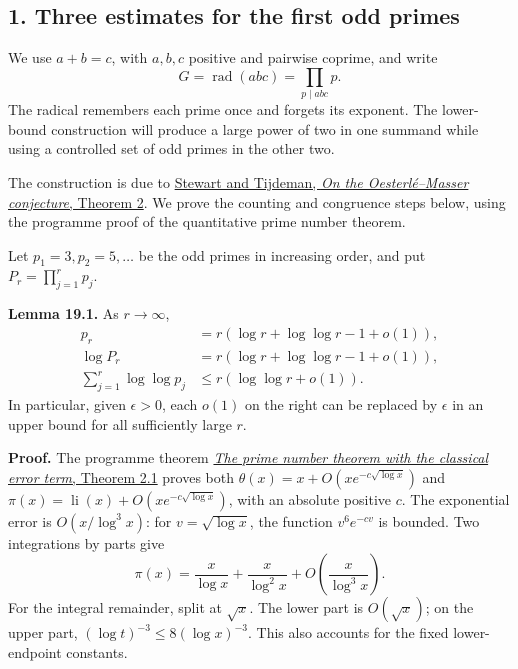 \documentclass[
  11pt,
  a4paper,
]{article}
\begin{document}
\subsection{1. Three estimates for the first odd
primes}\label{three-estimates-for-the-first-odd-primes}

We use \(a+b=c\), with \(a,b,c\) positive and pairwise coprime, and
write \[
 G=\operatorname{rad}(abc)=\prod_{p\mid abc}p.
 \tag{19.1}
\] The radical remembers each prime once and forgets its exponent. The
lower-bound construction will produce a large power of two in one
summand while using a controlled set of odd primes in the other two.

The construction is due to
\href{https://uwaterloo.ca/pure-mathematics/sites/default/files/uploads/documents/log_0023.pdf}{Stewart
and Tijdeman, \emph{On the Oesterlé--Masser conjecture}, Theorem 2}. We
prove the counting and congruence steps below, using the programme proof
of the quantitative prime number theorem.

Let \(p_1=3,p_2=5,\ldots\) be the odd primes in increasing order, and
put \(P_r=\prod_{j=1}^r p_j\).

\textbf{Lemma 19.1.} As \(r\to\infty\), \[
 \begin{aligned}
 p_r&=r(\log r+\log\log r-1+o(1)),\\
 \log P_r&=r(\log r+\log\log r-1+o(1)),\\
 \sum_{j=1}^r\log\log p_j&\le r(\log\log r+o(1)).
 \end{aligned}
 \tag{19.2}
\] In particular, given \(\epsilon>0\), each \(o(1)\) on the right can
be replaced by \(\epsilon\) in an upper bound for all sufficiently large
\(r\).

\textbf{Proof.} The programme theorem
\href{https://kokunoyumeto.github.io/open-math-courses-public/courses/NT-ZETA/NT-ZETA-12.html}{\emph{The prime number theorem with
the classical error term}, Theorem 2.1} proves both
\(\theta(x)=x+O(xe^{-c\sqrt{\log x}})\) and
\(\pi(x)=\operatorname{li}(x)+O(xe^{-c\sqrt{\log x}})\), with an
absolute positive \(c\). The exponential error is \(O(x/\log^3x)\): for
\(v=\sqrt{\log x}\), the function \(v^6e^{-cv}\) is bounded. Two
integrations by parts give \[
 \pi(x)=\frac{x}{\log x}+\frac{x}{\log^2x}
             +O\left(\frac{x}{\log^3x}\right).
 \tag{19.3}
\] For the integral remainder, split at \(\sqrt x\). The lower part is
\(O(\sqrt x)\); on the upper part, \((\log t)^{-3}\le8(\log x)^{-3}\).
This also accounts for the fixed lower-endpoint constants.
\end{document}
